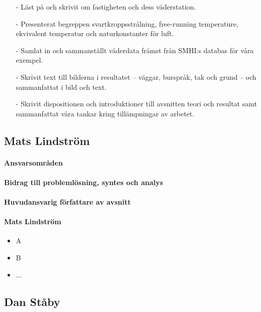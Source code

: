 \documentclass[12pt,a4paper]{article}
\begin{document}
\begin{itemize}
\item[-] Läst på och skrivit om fastigheten och dess väderstation.
\item[-] Presenterat begreppen svartkroppsstrålning, free-running temperature, ekvivalent temperatur och naturkonstanter för luft.
\item[-] Samlat in och sammanställt väderdata främst från SMHI:s databas för våra exempel.
\item[-] Skrivit text till bilderna i resultatet – väggar, burspråk, tak och grund – och sammanfattat i bild och text.
\item[-] Skrivit dispositionen och introduktioner till avsnitten teori och resultat samt sammanfattat våra tankar kring tillämpningar av arbetet.
\end{itemize}


\subsection*{Mats Lindström}

\paragraph{Ansvarsområden}

\paragraph{Bidrag till problemlösning, syntes och analys}

\paragraph{Huvudansvarig författare av avsnitt}


\paragraph{Mats Lindström}
\begin{itemize}
\item A
\item B
\item ...
\end{itemize}



\subsection*{Dan Ståby}
\end{document}
